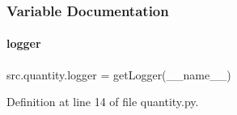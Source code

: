 \subsubsection{Variable Documentation}
\mbox{\label{namespacesrc_1_1quantity_acff8db4e0f2c2b0748a9286ac7a8ee52}} 
\paragraph{\texorpdfstring{logger}{logger}}
{\footnotesize\ttfamily src.\+quantity.\+logger = get\+Logger(\+\_\+\+\_\+name\+\_\+\+\_\+)}



Definition at line 14 of file quantity.\+py.

